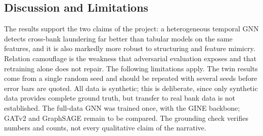 \subsection{Discussion and Limitations}
The results support the two claims of the project: a heterogeneous temporal GNN detects cross-bank laundering far better than tabular models on the same features, and it is also markedly more robust to structuring and feature mimicry. Relation camouflage is the weakness that adversarial evaluation exposes and that retraining alone does not repair. The following limitations apply. The twin results come from a single random seed and should be repeated with several seeds before error bars are quoted. All data is synthetic; this is deliberate, since only synthetic data provides complete ground truth, but transfer to real bank data is not established. The full-data GNN was trained once, with the GINE backbone; GATv2 and GraphSAGE remain to be compared. The grounding check verifies numbers and counts, not every qualitative claim of the narrative.
